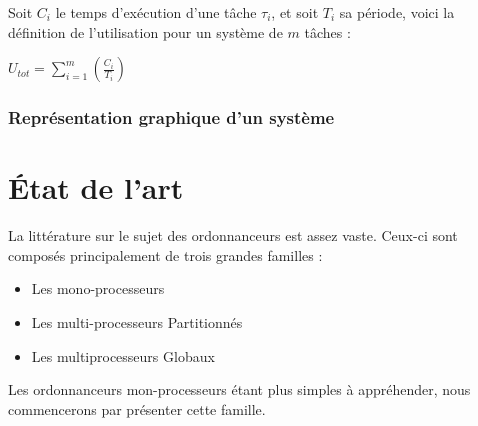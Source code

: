 \documentclass[11pt,a4paper,oneside]{report}
\begin{document}
Soit $C_i$ le temps d'exécution d'une tâche $\tau_i$, et soit $T_i$ sa période, voici la définition de 
l'utilisation pour un système de $m$ tâches :\\
\begin{center}
	$U_{tot} = \sum_{i = 1}^{m}(\frac{C_i}{T_i})$
\end{center}


\subsection{Représentation graphique d'un système}



%
%
\chapter{État de l'art}
\newtheorem{defi}{Déf.}

La littérature sur le sujet des ordonnanceurs est assez vaste. 
Ceux-ci sont composés principalement de trois grandes familles :\\
\begin{itemize}
	\item Les mono-processeurs
	\item Les multi-processeurs Partitionnés
	\item Les multiprocesseurs Globaux
\end{itemize}
Les ordonnanceurs mon-processeurs étant plus simples à appréhender, nous commencerons 
par présenter cette famille.
\end{document}
